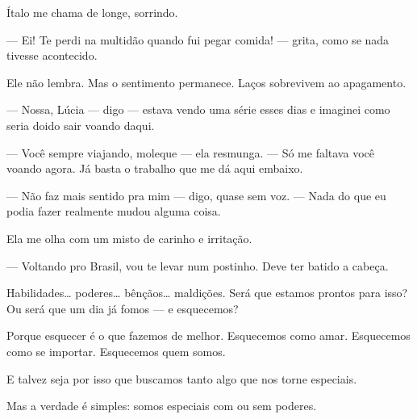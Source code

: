 Ítalo me chama de longe, sorrindo.

— Ei! Te perdi na multidão quando fui pegar comida! — grita, como se nada tivesse acontecido.

Ele não lembra.  
Mas o sentimento permanece.  
Laços sobrevivem ao apagamento.

— Nossa, Lúcia — digo — estava vendo uma série esses dias e imaginei como seria doido sair voando daqui.

— Você sempre viajando, moleque — ela resmunga. — Só me faltava você voando agora. Já basta o trabalho que me dá aqui embaixo.

— Não faz mais sentido pra mim — digo, quase sem voz. — Nada do que eu podia fazer realmente mudou alguma coisa.

Ela me olha com um misto de carinho e irritação.

— Voltando pro Brasil, vou te levar num postinho. Deve ter batido a cabeça.

\bigskip

Habilidades… poderes… bênçãos… maldições.  
Será que estamos prontos para isso?  
Ou será que um dia já fomos — e esquecemos?

Porque esquecer é o que fazemos de melhor.  
Esquecemos como amar.  
Esquecemos como se importar.  
Esquecemos quem somos.

E talvez seja por isso que buscamos tanto algo que nos torne especiais.

Mas a verdade é simples:  
somos especiais com ou sem poderes.
